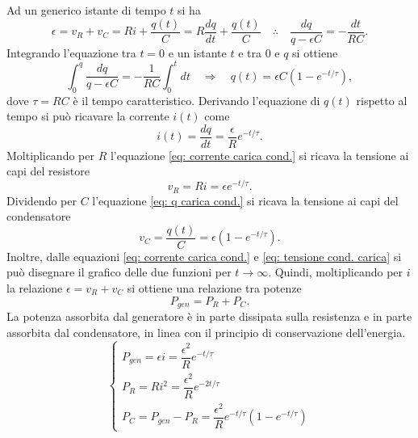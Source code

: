 Ad un generico istante di tempo $t$ si ha
\begin{equation}
    \epsilon=v_R+v_C=Ri+\frac{q(t)}{C}=R\frac{dq}{dt}+\frac{q(t)}{C}\quad\therefore\quad \frac{dq}{q-\epsilon C}=-\frac{dt}{RC}.
\end{equation}
Integrando l'equazione tra $t=0$ e un istante $t$ e tra 0 e $q$ si ottiene
\begin{equation}
    \label{eq: q carica cond.}
    \int_{0}^{q}\frac{dq}{q-\epsilon C}=-\frac{1}{RC}\int_{0}^{t}dt\quad\Rightarrow\quad q(t)=\epsilon C(1-e^{-t/\tau}),
\end{equation}
dove $\tau=RC$ è il tempo caratteristico.  Derivando l'equazione di $q(t)$ rispetto al tempo si può ricavare la corrente $i(t)$ come
\begin{equation}
    \label{eq: corrente carica cond.}
    i(t)=\frac{dq}{dt}=\frac{\epsilon}{R}e^{-t/\tau}.
\end{equation}
Moltiplicando per $R$ l'equazione \eqref{eq: corrente carica cond.} si ricava la tensione ai capi del resistore
\begin{equation}
    v_R=Ri=\epsilon e^{-t/\tau}.
\end{equation}
Dividendo per $C$ l'equazione \eqref{eq: q carica cond.} si ricava la tensione ai capi del condensatore
\begin{equation}
    \label{eq: tensione cond. carica}
    v_C=\frac{q(t)}{C}=\epsilon\left(1-e^{-t/\tau}\right).
\end{equation}
Inoltre, dalle equazioni \eqref{eq: corrente carica cond.} e \eqref{eq: tensione cond. carica} si può disegnare il grafico delle due funzioni per $t\to\infty$. Quindi, moltiplicando per $i$ la relazione $\epsilon=v_R+v_C$ si ottiene una relazione tra potenze
\begin{equation}
    P_{gen}=P_R+P_C.
\end{equation}
La potenza assorbita dal generatore è in parte dissipata sulla resistenza e in parte assorbita dal condensatore, in linea con il principio di conservazione dell'energia.
\begin{equation}
    \begin{cases}
        P_{gen}=\epsilon i=\dfrac{\epsilon^2}{R}e^{-t/\tau} \\[2ex]
        P_R=Ri^2=\dfrac{\epsilon^2}{R}e^{-2t/\tau} \\[2ex]
        P_C=P_{gen}-P_R=\dfrac{\epsilon^2}{R}e^{-t/\tau}\left(1-e^{-t/\tau}\right)
    \end{cases}
\end{equation}
